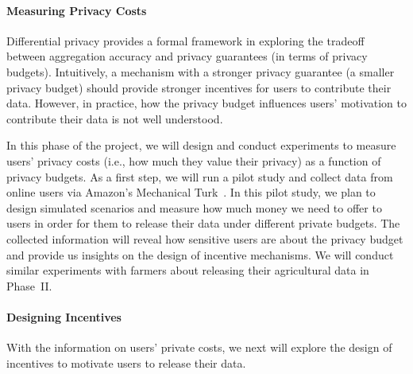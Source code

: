 \paragraph{Measuring Privacy Costs}
Differential privacy provides a formal framework in exploring the tradeoff between 
aggregation accuracy and privacy guarantees (in terms of privacy budgets).
Intuitively, a mechanism with a stronger privacy guarantee 
(a smaller privacy budget) 
should provide stronger incentives for users to contribute their data. 
However, in practice, how the privacy budget influences users' motivation 
to contribute their data is not well understood. 

In this phase of the project, 
we will design and conduct experiments to measure users' privacy costs 
(i.e., how much they value their privacy) as a function of privacy budgets.
As a first step, we will run a pilot study and collect data from online users 
via Amazon's Mechanical Turk~\cite{mturk}. 
In this pilot study, we plan to design simulated scenarios and measure 
how much money we need to offer to users in order for them to 
release their data under different private budgets.
The collected information will reveal how sensitive users are 
about the privacy budget and provide us insights on the design of 
incentive mechanisms.
We will conduct similar experiments with farmers about releasing their
agricultural data in Phase~II.

\paragraph{Designing Incentives} 
With the information on users' private costs, we next will
explore the design of incentives to motivate users to release their data.

